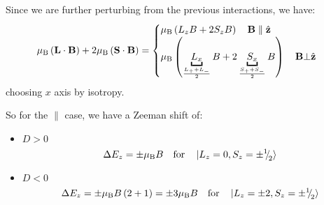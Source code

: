 \begin{parts}
	Since we are further perturbing from the previous interactions, we have:
	\begin{equation*}
		\mu_\textnormal{B} \left(\mathbf{L} \cdot \mathbf{B}\right) + 2\mu_\textnormal{B} \left(\mathbf{S} \cdot \mathbf{B}\right) =
		\begin{cases}
			\mu_\textnormal{B} \left(L_z B + 2S_z B\right) \hspace{1em} \mathbf{B}\parallel\hat{\mathbf{z}} \\
			\mu_\textnormal{B} \left(\underbracket{L_x}_{\frac{L_+ + L_-}{2}} B + 2 \underbracket{S_x}_{\frac{S_+ + S_-}{2}} B\right) \hspace{1em} \mathbf{B}\bot\hat{\mathbf{z}}
		\end{cases}
	\end{equation*}
	choosing $x$ axis by isotropy.
	
	So for the $\parallel$ case, we have a Zeeman shift of:
	\begin{itemize}
		\item \underline{$D > 0$}
		\begin{equation*}
			\Delta E_z = \pm \mu_\textnormal{B} B \textnormal{\hspace{1em}for\hspace{1em}} \ket{L_z = 0, S_z = \pm{{}^{1}{\mskip -5mu/\mskip -3mu}_{2}}}
		\end{equation*}
		\item \underline{$D < 0$}
		\begin{equation*}
			\Delta E_z = \pm \mu_\textnormal{B} B \left(2+1\right) = \pm 3 \mu_\textnormal{B} B \textnormal{\hspace{1em}for\hspace{1em}} \ket{L_z = \pm 2, S_z = \pm{{}^{1}{\mskip -5mu/\mskip -3mu}_{2}}}
		\end{equation*}
	\end{itemize}
	

\end{parts}
